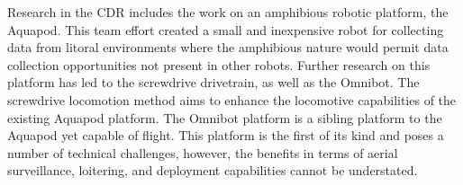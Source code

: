 \begin{singlespace}
Research in the CDR includes the work on an amphibious robotic platform, the Aquapod. This team effort created a small and inexpensive robot for collecting data from litoral environments where the amphibious nature would permit data collection opportunities not present in other robots. Further research on this platform has led to the screwdrive drivetrain, as well as the Omnibot. The screwdrive locomotion method aims to enhance the locomotive capabilities of the existing Aquapod platform. The Omnibot platform is a sibling platform to the Aquapod yet capable of flight. This platform is the first of its kind and poses a number of technical challenges, however, the benefits in terms of aerial surveillance, loitering, and deployment capabilities cannot be understated.  

  
\end{singlespace}